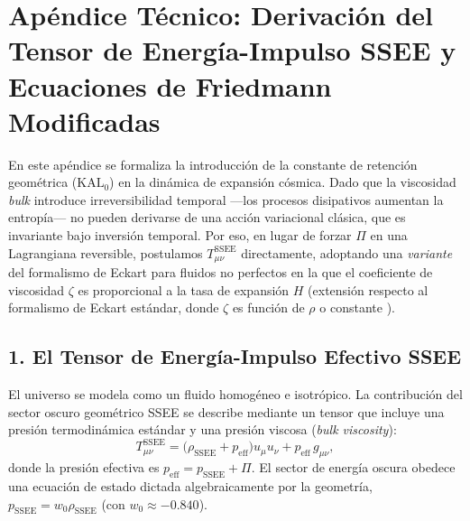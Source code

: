 
\section*{Apéndice Técnico: Derivación del Tensor de Energía-Impulso SSEE
          y Ecuaciones de Friedmann Modificadas}

En este apéndice se formaliza la introducción de la constante de retención
geométrica ($\mathrm{KAL}_{0}$) en la dinámica de expansión cósmica.
Dado que la viscosidad \textit{bulk} introduce irreversibilidad temporal
---los procesos disipativos aumentan la entropía--- no pueden derivarse de
una acción variacional clásica, que es invariante bajo inversión temporal.
Por eso, en lugar de forzar $\Pi$ en una Lagrangiana reversible, postulamos
$T_{\mu\nu}^{\mathrm{SSEE}}$ directamente, adoptando una \emph{variante}
del formalismo de Eckart para fluidos no perfectos en la que el coeficiente
de viscosidad $\zeta$ es proporcional a la tasa de expansión $H$ (extensión
respecto al formalismo de Eckart estándar, donde $\zeta$ es función de
$\rho$ o constante \citep{Weinberg1971}).

\subsection*{1. El Tensor de Energía-Impulso Efectivo SSEE}

El universo se modela como un fluido homogéneo e isotrópico.
La contribución del sector oscuro geométrico SSEE se describe mediante un
tensor que incluye una presión termodinámica estándar y una presión viscosa
(\textit{bulk viscosity}):
%
\begin{equation}
  T_{\mu\nu}^{\mathrm{SSEE}}
    = \bigl(\rho_{\mathrm{SSEE}} + p_{\mathrm{eff}}\bigr)u_\mu u_\nu
      + p_{\mathrm{eff}}\,g_{\mu\nu},
  \label{eq:app_Tmunu}
\end{equation}
%
donde la presión efectiva es $p_{\mathrm{eff}} = p_{\mathrm{SSEE}} + \Pi$.
El sector de energía oscura obedece una ecuación de estado dictada
algebraicamente por la geometría, $p_{\mathrm{SSEE}} = w_{0}\rho_{\mathrm{SSEE}}$
(con $w_{0} \approx -0.840$).

